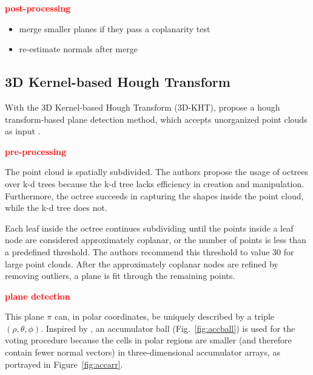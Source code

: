 \documentclass[main.tex]{subfiles}
\begin{document}
\textbf{\textcolor{red}{post-processing}}
\begin{itemize}
    \item merge smaller planes if they pass a coplanarity test
    \item re-estimate normals after merge
\end{itemize}

\subsection{3D Kernel-based Hough Transform}\label{sub:3dkht}
With the 3D Kernel-based Hough Transform (3D-KHT),
\citeauthor{Limberger_Oliveira_2015}\cite{Limberger_Oliveira_2015} propose a hough transform-based plane detection method, 
which accepts unorganized point clouds as input \cite{Limberger_Oliveira_2015}.

\textbf{\textcolor{red}{pre-processing}}

The point cloud is spatially subdivided. The authors propose the usage of octrees over k-d trees because the k-d tree lacks efficiency in creation and manipulation.
Furthermore, the octree succeeds in capturing the shapes inside the point cloud, while the k-d tree does not.

Each leaf inside the octree continues subdividing until the points inside a leaf node are considered approximately coplanar, or the number of points is less than a predefined threshold.
The authors recommend this threshold to value 30 for large point clouds.
After the approximately coplanar nodes are refined by removing outliers, a plane is fit through the remaining points.

\textbf{\textcolor{red}{plane detection}}

This plane $\pi$ can, in polar coordinates, be uniquely described by a triple $(\rho, \theta, \phi)$.
Inspired by \citeauthor{Borrmann_Elseberg_Lingemann_Nüchter_2011}\cite{Borrmann_Elseberg_Lingemann_Nüchter_2011}, an accumulator ball (Fig.~\ref{fig:accball}) is used for the voting procedure because the cells in polar regions are smaller (and therefore
contain fewer normal vectors) in three-dimensional accumulator arrays, as portrayed in Figure~\ref{fig:accarr}.
\end{document}
